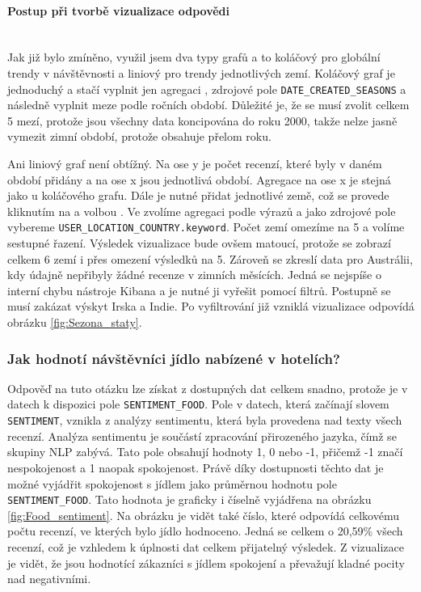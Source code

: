 \documentclass[czech,BP]{thesiskiv}
\begin{document}
\paragraph{Postup při tvorbě vizualizace odpovědi}
\mbox{}\\
Jak již bylo zmíněno, využil jsem dva typy grafů a to koláčový pro globální trendy v návštěvnosti a liniový pro trendy jednotlivých zemí. Koláčový graf je jednoduchý a stačí vyplnit jen agregaci , zdrojové pole \texttt{DATE\_CREATED\_SEASONS} a následně vyplnit meze podle ročních období. Důležité je, že se musí zvolit celkem 5 mezí, protože jsou všechny data koncipována do roku 2000, takže nelze jasně vymezit zimní období, protože obsahuje přelom roku.


Ani liniový graf není obtížný. Na ose y je počet recenzí, které byly v daném období přidány a na ose x jsou jednotlivá období. Agregace na ose x je stejná jako u koláčového grafu. Dále je nutné přidat jednotlivé země, což se provede kliknutím na  a volbou . Ve  zvolíme agregaci podle výrazů a jako zdrojové pole vybereme \texttt{USER\_LOCATION\_COUNTRY.keyword}. Počet zemí omezíme na 5 a volíme sestupné řazení. Výsledek vizualizace bude ovšem matoucí, protože se zobrazí celkem 6 zemí i přes omezení výsledků na 5. Zároveň se zkreslí data pro Austrálii, kdy údajně nepřibyly žádné recenze v zimních měsících. Jedná se nejspíše o interní chybu nástroje Kibana a je nutné ji vyřešit pomocí filtrů. Postupně se musí zakázat výskyt Irska a Indie. Po vyfiltrování již vzniklá vizualizace odpovídá obrázku \ref{fig:Sezona_staty}.

\subsubsection{Jak hodnotí návštěvníci jídlo nabízené v hotelích?}
\label{subsub:Jídlo}
Odpověď na tuto otázku lze získat z dostupných dat celkem snadno, protože je v datech k dispozici pole \texttt{SENTIMENT\_FOOD}. Pole v datech, která začínají slovem \texttt{SENTIMENT}, vznikla z analýzy sentimentu, která byla provedena nad texty všech recenzí. Analýza sentimentu je součástí zpracování přirozeného jazyka, čímž se skupiny NLP zabývá. Tato pole obsahují hodnoty 1, 0 nebo -1, přičemž -1 značí nespokojenost a 1 naopak spokojenost. Právě díky dostupnosti těchto dat je možné vyjádřit spokojenost s jídlem jako průměrnou hodnotu pole \texttt{SENTIMENT\_FOOD}. Tato hodnota je graficky i číselně vyjádřena na obrázku \ref{fig:Food_sentiment}. Na obrázku je vidět také číslo, které odpovídá celkovému počtu recenzí, ve kterých bylo jídlo hodnoceno. Jedná se celkem o 20,59\% všech recenzí, což je vzhledem k úplnosti dat celkem přijatelný výsledek. Z vizualizace je vidět, že jsou hodnotící zákazníci s jídlem spokojení a převažují kladné pocity nad negativními.
\end{document}
